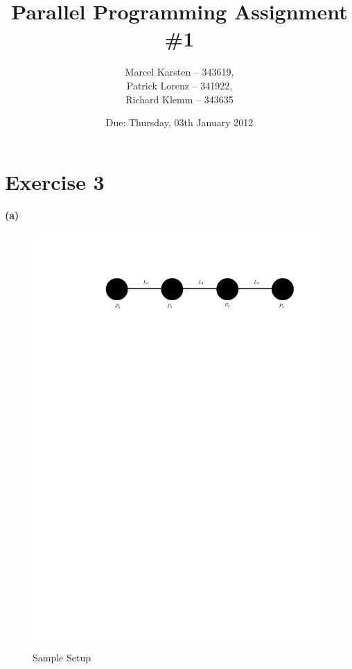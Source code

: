 \documentclass[a4paper,twoside,11pt]{article}
\begin{document}
\pagestyle{fancyplain}

\title{Parallel Programming Assignment \#1} 
\author{Marcel Karsten -- 343619,\\ Patrick Lorenz -- 341922,\\ Richard Klemm -- 343635 }
\date{Due: Thursday, 03th January 2012} %
\maketitle

\lhead{}
\renewcommand{\headrulewidth}{0px}



\section{Exercise 3}
\textbf{(a)}
\begin{figure}[!htbp]
    \begin{center}
        \includegraphics[scale=1]{3a_1.pdf}
    \end{center}
    \caption{Sample Setup}
    \label{SampleSetup}
\end{figure}
\end{document}
